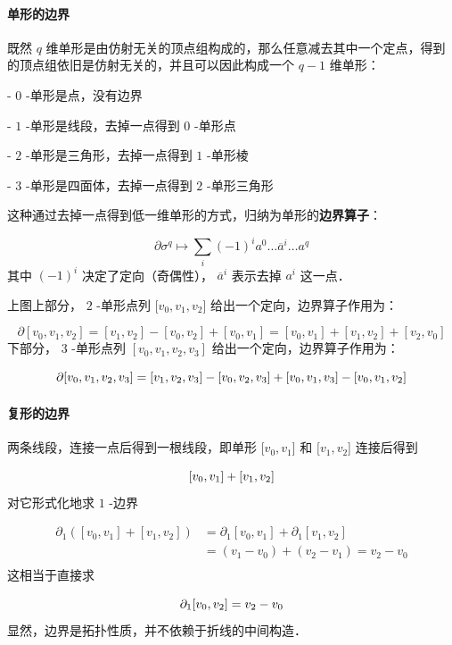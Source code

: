         \paragraph{单形的边界}
            既然 $q$ 维单形是由仿射无关的顶点组构成的，那么任意减去其中一个定点，得到的顶点组依旧是仿射无关的，并且可以因此构成一个 $q-1$ 维单形：\par
            - $0$ -单形是点，没有边界\par
            - $1$ -单形是线段，去掉一点得到 $0$ -单形点\par
            - $2$ -单形是三角形，去掉一点得到 $1$ -单形棱\par
            - $3$ -单形是四面体，去掉一点得到 $2$ -单形三角形\par
            这种通过去掉一点得到低一维单形的方式，归纳为单形的\textbf{边界算子}：\par
            $$
                \partial \sigma^q \mapsto \sum_i (-1)^i a^0 \dots \overline{a}^i \dots a^q \label{eq:homology-boundary-simplex}
            $$
            其中 $(-1)^i$ 决定了定向（奇偶性）， $\overline{a}^i$ 表示去掉 $a^i$ 这一点．\par
            上图上部分， $2$ -单形点列 $[v_0,v_1,v_2$] 给出一个定向，边界算子作用为：\par
            $$
                \partial [v_0,v_1,v_2] = [v_1,v_2] - [v_0,v_2] + [v_0,v_1] =  [v_0,v_1] + [v_1,v_2] + [v_2,v_0]
            $$
            下部分， $3$ -单形点列 $[v_0,v_1,v_2,v_3]$ 给出一个定向，边界算子作用为：\par
            $$
                \partial [v_0,v_1,v_2,v_3] = [v_1,v_2,v_3] - [v_0,v_2,v_3] + [v_0,v_1,v_3] - [v_0,v_1,v_2] \\
            $$

        \paragraph{复形的边界}
            两条线段，连接一点后得到一根线段，即单形 $[v_0,v_1$] 和 $[v_1,v_2$] 连接后得到\par
            $$
                [v_0,v_1]+[v_1,v_2] \\
            $$
            对它形式化地求 $1$ -边界\par
            $$
            \begin{aligned}
                \partial_1([v_0,v_1]+[v_1,v_2]) &=\partial_1[v_0,v_1]+\partial_1[v_1,v_2] \nonumber \\
                &=(v_1-v_0)+(v_2-v_1) =v_2-v_0 \nonumber \\
            \end{aligned}
            $$
            这相当于直接求\par
            $$
                \partial_1[v_0,v_2] = v_2 - v_0 \\
            $$
            显然，边界是拓扑性质，并不依赖于折线的中间构造．\par

